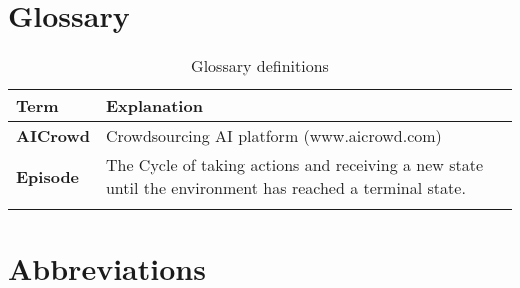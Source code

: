 %
%
\clearpage
\section{Glossary}\label{section.glossar}

\begin{longtable}{|m{3cm}|m{11cm}|}\hline
\rowcolor{gray} \textbf{Term}&
Explanation \\ \hline

\textbf{AICrowd}&
Crowdsourcing AI platform (www.aicrowd.com)\\ \hline

\textbf{Episode}&
The Cycle of taking actions and receiving a new state until the environment has reached a terminal state. \\ \hline






\caption{Glossary definitions}
\label{tab:glossar}
\end{longtable}
\clearpage

\section{Abbreviations}\label{section:abkuerzungsverzeichnis}


